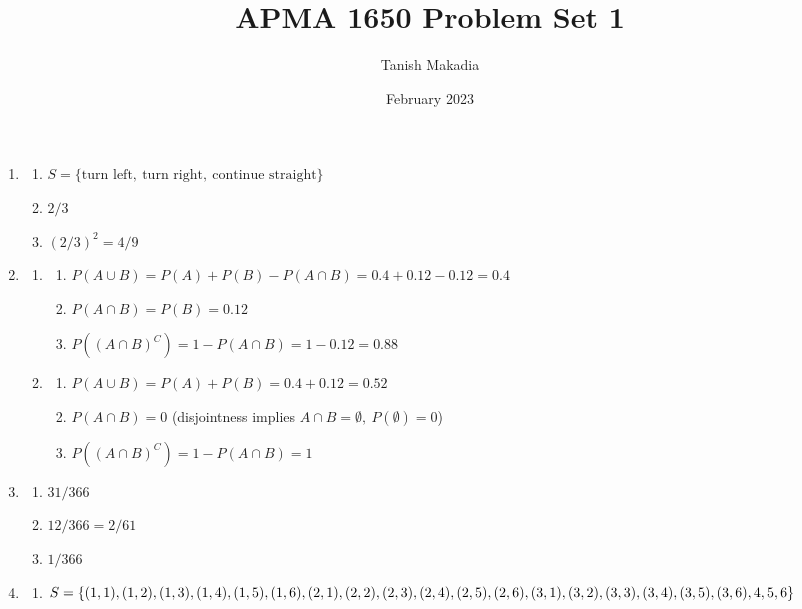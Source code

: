 \documentclass[12pt,reqno]{article}
\title{APMA 1650 Problem Set 1}
\author{Tanish Makadia}
\date{February 2023}
\theoremstyle{plain}
\theoremstyle{definition}
\begin{document}
\maketitle

\begin{enumerate}
    \item \begin{enumerate}
            \item \(S = \{\text{turn left},\ \text{turn right},\ \text{continue straight}\}\)
            \item \(2/3\)
            \item \((2/3)^2=4/9\) \bigskip
    \end{enumerate}
    \item \begin{enumerate}
        \item \begin{enumerate}
            \item \(P(A\cup B) = P(A) + P(B) - P(A\cap B)=0.4+0.12-0.12=0.4\)
            \item \(P(A\cap B) = P(B) = 0.12\)
            \item \(P((A\cap B)^C)=1-P(A\cap B)=1-0.12=0.88\)
        \end{enumerate}
        \item \begin{enumerate}
            \item \(P(A\cup B) = P(A) + P(B) =0.4+0.12=0.52\)
            \item \(P(A\cap B) = 0\) (disjointness implies \(A\cap B=\emptyset,\ P(\emptyset)=0\))
            \item \(P((A\cap B)^C)=1 - P(A\cap B) = 1\) \bigskip
        \end{enumerate}
    \end{enumerate}
    \item \begin{enumerate}
        \item \(31/366\)
        \item \(12/366=2/61\)
        \item \(1/366\) \bigskip
    \end{enumerate}
    \item \begin{enumerate}
        \item \(S = \{(1,1),(1,2),(1,3),(1,4),(1,5),(1,6),(2,1),(2,2),(2,3),(2,4),(2,5),\\(2,6),(3,1),(3,2),(3,3),(3,4),(3,5),(3,6),4,5,6\}\)

\end{enumerate}
\end{enumerate}
\end{document}
